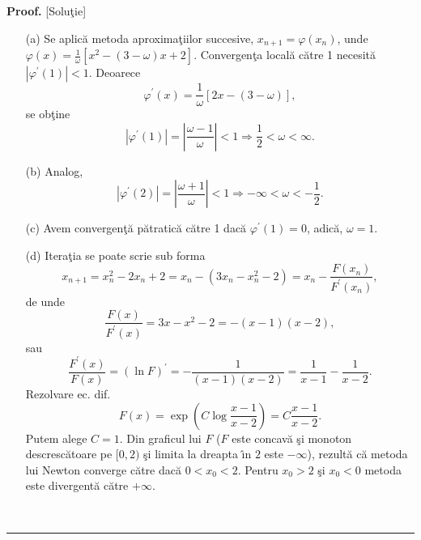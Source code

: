 \documentclass[12pt]{article}%
\newenvironment{proof}[1][Proof]{\noindent\textbf{#1.} }{\ \rule{0.5em}{0.5em}}
\begin{document}
\begin{proof}
[Solu\c{t}ie]

\begin{enumerate}
\item[(a)] Se aplic\u{a} metoda aproxima\c{t}iilor succesive, $x_{n+1}%
=\varphi(x_{n})$, unde $\varphi(x)=\frac{1}{\omega}\left[  x^{2}-\left(
3-\omega\right)  x+2\right]  $. Convergen\c{t}a local\u{a} c\u{a}tre 1
necesit\u{a}  $|\varphi^{\prime}(1)|<1$. Deoarece%
\[
\varphi^{\prime}(x)=\frac{1}{\omega}\left[  2x-\left(  3-\omega\right)
\right]  ,
\]
se ob\c{t}ine%
\[
\left\vert \varphi^{\prime}(1)\right\vert =\left\vert \frac{\omega-1}{\omega
}\right\vert <1\Longrightarrow\frac{1}{2}<\omega<\infty.
\]


\item[(b)] Analog,%
\[
\left\vert \varphi^{\prime}(2)\right\vert =\left\vert \frac{\omega+1}{\omega
}\right\vert <1\Longrightarrow-\infty<\omega<-\frac{1}{2}.
\]


\item[(c)] Avem convergen\c{t}\u{a} p\u{a}tratic\u{a} c\u{a}tre 1 dac\u{a}
$\varphi^{\prime}(1)=0$, adic\u{a}, $\omega=1$.

\item[(d)] Itera\c{t}ia se poate scrie sub forma%
\[
x_{n+1}=x_{n}^{2}-2x_{n}+2=x_{n}-\left(  3x_{n}-x_{n}^{2}-2\right)
=x_{n}-\frac{F(x_{n})}{F^{\prime}(x_{n})},
\]
de unde%
\[
\frac{F(x)}{F^{\prime}(x)}=3x-x^{2}-2=-\left(  x-1\right)  \left(  x-2\right)
,
\]
sau%
\[
\frac{F^{\prime}(x)}{F(x)}=\left(  \ln F\right)  ^{\prime}=-\frac{1}{\left(
x-1\right)  \left(  x-2\right)  }=\frac{1}{x-1}-\frac{1}{x-2}.
\]
Rezolvare ec. dif.
\[
F(x)=\exp\left(  C\log\frac{x-1}{x-2}\right)  =C\frac{x-1}{x-2}.
\]
Putem alege $C=1$. Din graficul lui  $F$ ($F$ este concav\u{a} \c{s}i monoton
descresc\u{a}toare pe $[0,2)$ \c{s}i limita la dreapta \^{\i}n $2$ este
$-\infty$), rezult\u{a} c\u{a} metoda lui Newton converge c\u{a}tre dac\u{a}
$0<x_{0}<2$. Pentru $x_{0}>2$ \c{s}i $x_{0}<0$ metoda este divergent\u{a}
c\u{a}tre $+\infty$.
\end{enumerate}
\end{proof}%
\end{document}
